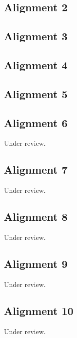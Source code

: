 \documentclass{scrartcl}
\begin{document}
\subsection{Alignment 2}
\label{sec:align_2}
\clearpage

\subsection{Alignment 3}
\label{sec:align_3}
\clearpage

\subsection{Alignment 4}
\label{sec:align_4}
\clearpage

\subsection{Alignment 5}
\label{sec:align_5}
\clearpage

\subsection{Alignment 6}
\label{sec:align_6}
Under review.%
\clearpage

\subsection{Alignment 7}
\label{sec:align_7}
Under review.%
\clearpage

\subsection{Alignment 8}
\label{sec:align_8}
Under review.%
\clearpage

\subsection{Alignment 9}
\label{sec:align_9}
Under review.%
\clearpage

\subsection{Alignment 10}
\label{sec:align_10}
Under review.%
\clearpage
\end{document}
